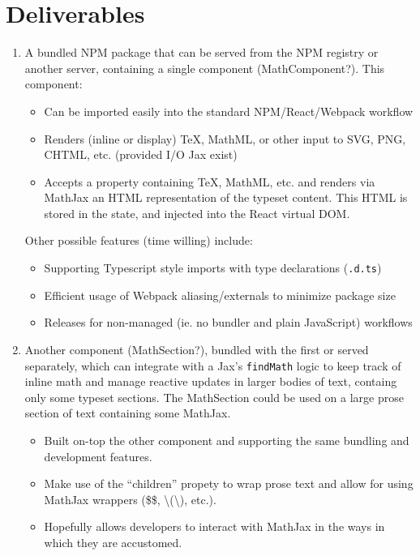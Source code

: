 \documentclass[12pt]{article}
\begin{document}
  \section*{Deliverables}
		\begin{enumerate}
			\item A bundled NPM package that can be served from the NPM registry or another server, containing a single component (MathComponent?). This component:
			\begin{itemize}
				\item Can be imported easily into the standard NPM/React/Webpack workflow
				\item Renders (inline or display) \TeX, MathML, or other input to SVG, PNG, CHTML, etc. (provided I/O Jax exist)
        \item Accepts a property containing \TeX, MathML, etc. and renders via MathJax an HTML representation of the typeset content. This HTML is stored in the state, and injected into the React virtual DOM.
      \end{itemize}
			\subitem Other possible features (time willing) include:
			\begin{itemize}
				\item Supporting Typescript style imports with type declarations (\texttt{.d.ts})
				\item Efficient usage of Webpack aliasing/externals to minimize package size
				\item Releases for non-managed (ie. no bundler and plain JavaScript) workflows
			\end{itemize}
    \item Another component (MathSection?), bundled with the first or served separately, which can integrate with a Jax's \texttt{findMath} logic to keep track of inline math and manage reactive updates in larger bodies of text, containg only some typeset sections. The MathSection could be used on a large prose section of text containing some MathJax.
			\begin{itemize}
				\item Built on-top the other component and supporting the same bundling and development features.
        \item Make use of the ``children'' propety to wrap prose text and allow for using MathJax wrappers (\$\$, \textbackslash(\textbackslash), etc.).
				\item Hopefully allows developers to interact with MathJax in the ways in which they are accustomed.
			\end{itemize}
			
		\end{enumerate}
\end{document}
